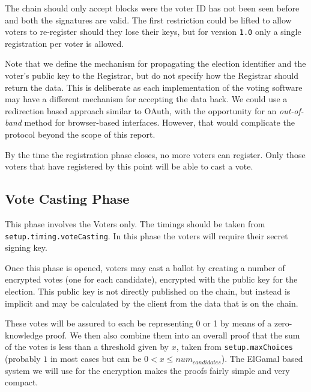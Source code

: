 The chain should only accept blocks were the voter ID has not been seen before and both the signatures are valid. The first restriction could be lifted to allow voters to re-register should they lose their keys, but for version \texttt{1.0} only a single registration per voter is allowed.

Note that we define the mechanism for propagating the election identifier and the voter's public key to the Registrar, but do not specify how the Registrar should return the data. This is deliberate as each implementation of the voting software may have a different mechanism for accepting the data back. We could use a redirection based approach similar to OAuth, with the opportunity for an \emph{out-of-band} method for browser-based interfaces. However, that would complicate the protocol beyond the scope of this report.

By the time the registration phase closes, no more voters can register. Only those voters that have registered by this point will be able to cast a vote.

\subsection{Vote Casting Phase}
\label{ch:astris:detail:vote}

This phase involves the Voters only. The timings should be taken from \texttt{setup.timing.voteCasting}. In this phase the voters will require their secret signing key.

Once this phase is opened, voters may cast a ballot by creating a number of encrypted votes (one for each candidate), encrypted with the public key for the election. This public key is not directly published on the chain, but instead is implicit and may be calculated by the client from the data that is on the chain.

These votes will be assured to each be representing 0 or 1 by means of a zero-knowledge proof. We then also combine them into an overall proof that the sum of the votes is less than a threshold given by $x$, taken from \texttt{setup.maxChoices} (probably $1$ in most cases but can be $0 < x \le num_{candidates}$). The ElGamal based system we will use for the encryption makes the proofs fairly simple and very compact.

